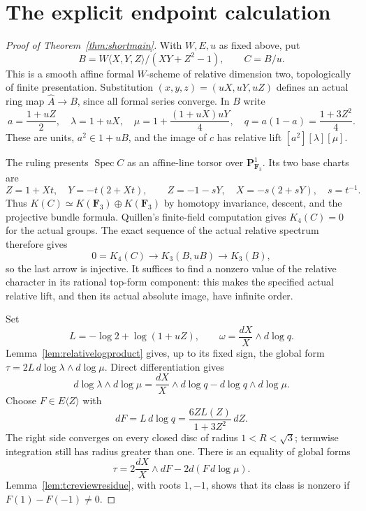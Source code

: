 \documentclass[11pt,a4paper]{article}
\theoremstyle{remark}
\begin{document}
\section{The explicit endpoint calculation}
\begin{proof}[Proof of Theorem~\ref{thm:shortmain}]
With $W,E,u$ as fixed above, put
\[
 B=W\langle X,Y,Z\rangle/(XY+Z^2-1),\qquad C=B/u.
\]
This is a smooth affine formal $W$-scheme of relative dimension two,
topologically of finite presentation. Substitution
$(x,y,z)=(uX,uY,uZ)$ defines an actual ring map $\widehat A\to B$, since all
formal series converge. In $B$ write
\[
 a=\frac{1+uZ}{2},\quad \lambda=1+uX,\quad
 \mu=1+\frac{(1+uX)uY}{4},\quad
 q=a(1-a)=\frac{1+3Z^2}{4}.
\]
These are units, $a^2\in1+uB$, and the image of $c$ has relative lift
$[a^2][\lambda][\mu]$.

The ruling presents $\operatorname{Spec}C$ as an affine-line torsor
over $\mathbf P^1_{\mathbf F_3}$. Its two base charts are
\[
 Z=1+Xt,\quad Y=-t(2+Xt),\qquad
 Z=-1-sY,\quad X=-s(2+sY),\quad s=t^{-1}.
\]
Thus $K(C)\simeq K(\mathbf F_3)\oplus K(\mathbf F_3)$ by homotopy
invariance, descent, and the projective bundle formula. Quillen's
finite-field computation gives $K_4(C)=0$ for the actual groups.
The exact sequence of the actual relative spectrum therefore gives
\[
 0=K_4(C)\longrightarrow K_3(B,uB)\longrightarrow K_3(B),
\]
so the last arrow is injective. It suffices to find a nonzero value
of the relative character in its rational top-form component:
this makes the specified actual relative lift, and then its actual
absolute image, have infinite order.

Set
\[
 L=-\log2+\log(1+uZ),\qquad
 \omega=\frac{dX}{X}\wedge d\log q.
\]
Lemma~\ref{lem:relativelogproduct} gives, up to its fixed sign, the
global form $\tau=2L\,d\log\lambda\wedge d\log\mu$.
Direct differentiation gives
\[
 d\log\lambda\wedge d\log\mu
   =\frac{dX}{X}\wedge d\log q-d\log q\wedge d\log\mu.
\]
Choose $F\in E\langle Z\rangle$ with
\[
 dF=L\,d\log q=\frac{6ZL(Z)}{1+3Z^2}\,dZ.
\]
The right side converges on every closed disc of radius
$1<R<\sqrt3$; termwise integration still has radius greater than one.
There is an equality of global forms
\begin{equation}\label{eq:directtcglobalform}
 \tau=2\frac{dX}{X}\wedge dF-2d(F\,d\log\mu).
\end{equation}
Lemma~\ref{lem:tcreviewresidue}, with roots $1,-1$, shows that its
class is nonzero if $F(1)-F(-1)\ne0$.


\end{proof}
\end{document}
